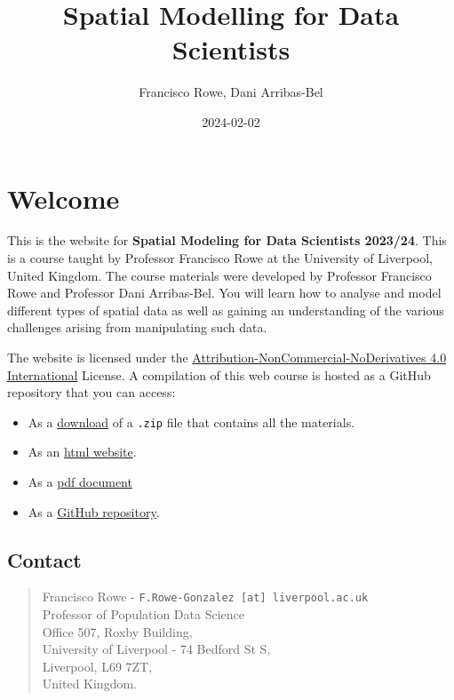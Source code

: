 \documentclass[
  letterpaper,
  DIV=11,
  numbers=noendperiod,
  oneside]{scrreprt}
\title{Spatial Modelling for Data Scientists}
\author{Francisco Rowe, Dani Arribas-Bel}
\date{2024-02-02}
\providecommand{\tightlist}{%
  \setlength{\itemsep}{0pt}\setlength{\parskip}{0pt}}\usepackage{longtable,booktabs,array}
\renewcommand*\contentsname{Table of contents}
\newcommand\contentsname{Table of contents}
\begin{document}
\maketitle

\renewcommand*\contentsname{Table of contents}
{
\hypersetup{linkcolor=}
\setcounter{tocdepth}{2}
\tableofcontents
}

\chapter*{Welcome}\label{welcome}


This is the website for \textbf{Spatial Modeling for Data Scientists
2023/24}. This is a course taught by Professor Francisco Rowe at the
University of Liverpool, United Kingdom. The course materials were
developed by Professor Francisco Rowe and Professor Dani Arribas-Bel.
You will learn how to analyse and model different types of spatial data
as well as gaining an understanding of the various challenges arising
from manipulating such data.

The website is licensed under the
\href{https://creativecommons.org/licenses/by-nc-nd/4.0/}{Attribution-NonCommercial-NoDerivatives
4.0 International} License. A compilation of this web course is hosted
as a GitHub repository that you can access:

\begin{itemize}
\tightlist
\item
  As a
  \href{https://github.com/GDSL-UL/san/archive/master.zip}{download} of
  a \texttt{.zip} file that contains all the materials.
\item
  As an \href{https://gdsl-ul.github.io/san/}{html website}.
\item
  As a
  \href{https://gdsl-ul.github.io/san/spatial_analysis_notes.pdf}{pdf
  document}
\item
  As a \href{https://github.com/GDSL-UL/san}{GitHub repository}.
\end{itemize}

\section*{Contact}\label{contact}


\begin{quote}
Francisco Rowe - \texttt{F.Rowe-Gonzalez\ {[}at{]}\ liverpool.ac.uk}\\
Professor of Population Data Science\\
Office 507, Roxby Building,\\
University of Liverpool - 74 Bedford St S,\\
Liverpool, L69 7ZT,\\
United Kingdom.
\end{quote}
\end{document}
